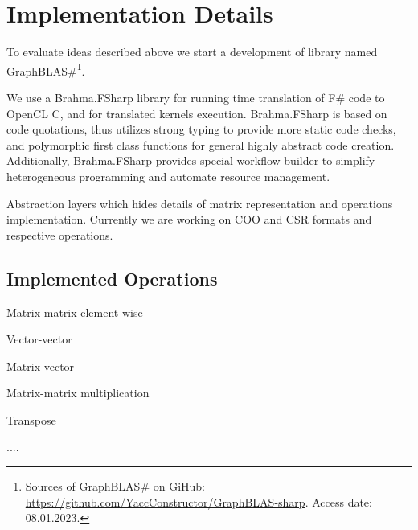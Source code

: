 \section{Implementation Details}

To evaluate ideas described above we start a development of library named GraphBLAS\#\footnote{Sources of GraphBLAS\# on GiHub: \url{https://github.com/YaccConstructor/GraphBLAS-sharp}. Access date: 08.01.2023.}.

We use a Brahma.FSharp library for running time translation of F\# code to OpenCL C, and for translated kernels execution. 
Brahma.FSharp is based on code quotations, thus utilizes strong typing to provide more static code checks, and polymorphic first class functions for general highly abstract code creation.
Additionally, Brahma.FSharp provides special workflow builder to simplify heterogeneous programming and automate resource management.  

Abstraction layers which hides details of matrix representation and operations implementation.
Currently we are working on COO and CSR formats and respective operations.

\subsection{Implemented Operations}
Matrix-matrix element-wise

Vector-vector

Matrix-vector 

Matrix-matrix multiplication

Transpose

....